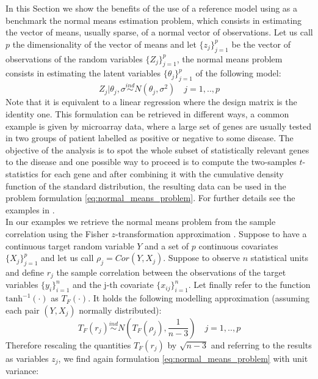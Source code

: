 \documentclass[american,]{article}
\theoremstyle{definition}
\begin{document}
In this Section we show the benefits of the use of a reference model using as a benchmark the normal means estimation problem, which consists in estimating the vector of means, usually sparse, of a normal vector of observations. Let us call $p$ the dimensionality of the vector of means and let $\{z_{j}\}_{j=1}^{p}$ be the vector of observations of the random variables $\{Z_{j}\}_{j=1}^{p}$, the normal means problem consists in estimating the latent variables $\{\theta_{j}\}_{j=1}^{p}$ of the following model:
\
\begin{equation}\label{eq:normal_means_problem}
Z_{j}|\theta_{j},\sigma\overset{ind}{\sim}N(\theta_{j},\sigma^{2}) \quad j=1,..,p
\end{equation}
Note that it is equivalent to a linear regression where the design matrix is the identity one. This formulation can be retrieved in different ways, a common example is given by microarray data, where a large set of genes are usually tested in two groups of patient labelled as positive or negative to some disease. The objective of the analysis is to spot the whole subset of statistically relevant genes to the disease and one possible way to proceed is to compute the two-samples $t$-statistics for each gene and after combining it with the cumulative density function of the standard distribution, the resulting data can be used in the problem formulation \eqref{eq:normal_means_problem}. For further details see the examples in \cite{paper:efron, book:efron}. 
\\
In our examples we retrieve the normal means problem from the sample correlation using the Fisher $z$-transformation approximation \citep{paper:hawkins}. Suppose to have a continuous target random variable $Y$ and a set of $p$ continuous covariates $\{X_{j}\}_{j=1}^{p}$ and let us call $\rho_{j}=Cor(Y,X_{j})$. Suppose to observe $n$ statistical units and define $r_{j}$ the sample correlation between the observations of the target variables $\{y_{i}\}_{i=1}^{n}$ and the j-th covariate $\{x_{ij}\}_{i=1}^{n}$. Let finally refer to the function $\text{tanh}^{-1}(\cdot)$ as $T_{F}(\cdot)$. It holds the following modelling approximation (assuming each pair $(Y,X_{j})$ normally distributed):
\
\begin{equation} \label{eq:fisher_transformation}
T_{F}(r_{j})\overset{ind}{\sim} N(T_{F}(\rho_{j}),\frac{1}{n-3}) \quad j=1,..,p
\end{equation}
Therefore rescaling the quantities $T_{F}(r_{j})$ by $\sqrt{n-3}$ and referring to the results as variables $z_{j}$, we find again formulation \eqref{eq:normal_means_problem} with unit variance:
\end{document}
